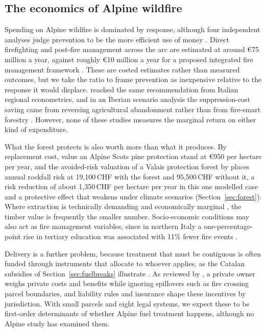 \documentclass[11pt,a4paper]{article}
\begin{document}
\subsection{The economics of Alpine wildfire}
\label{sec:economics}

Spending on Alpine wildfire is dominated by response, although four independent analyses judge prevention to be the more efficient use of money \citep{muller_forest_2020, michetti_forest_2019, lecinadiaz_incorporating_2023, kirschner_governance_2024}. Direct firefighting and post-fire management across the arc are estimated at around €75 million a year, against roughly €10 million a year for a proposed integrated fire management framework \citep{muller_forest_2020}. These are costed estimates rather than measured outcomes, but we take the ratio to frame prevention as inexpensive relative to the response it would displace. \citet{michetti_forest_2019} reached the same recommendation from Italian regional econometrics, and in an Iberian scenario analysis the suppression-cost saving came from reversing agricultural abandonment rather than from fire-smart forestry \citep{lecinadiaz_incorporating_2023}. However, none of these studies measures the marginal return on either kind of expenditure.

What the forest protects is also worth more than what it produces. By replacement cost, \citet{accastello_asforesee_2019} value an Alpine Scots pine protection stand at €950 per hectare per year, and the avoided-risk valuation of a Valais protection forest by \citet{moos_climate_2021} places annual rockfall risk at 19{,}100\,CHF with the forest and 95{,}500\,CHF without it, a risk reduction of about 1{,}350\,CHF per hectare per year in this one modelled case and a protective effect that weakens under climate scenarios (Section~\ref{sec:forest}). Where extraction is technically demanding and economically marginal \citep{dinca_timber_2025}, the timber value is frequently the smaller number. Socio-economic conditions may also act as fire management variables, since in northern Italy a one-percentage-point rise in tertiary education was associated with 11\% fewer fire events \citep{michetti_forest_2019}.

Delivery is a further problem, because treatment that must be contiguous is often funded through instruments that allocate to whoever applies, as the Catalan subsidies of Section~\ref{sec:fuelbreaks} illustrate \citep{gorrizmifsud_current_2026}. As reviewed by \citet{bayham_economics_2022}, a private owner weighs private costs and benefits while ignoring spillovers such as fire crossing parcel boundaries, and liability rules and insurance shape these incentives by jurisdiction. With small parcels and eight legal systems, we expect these to be first-order determinants of whether Alpine fuel treatment happens, although no Alpine study has examined them.
\end{document}
